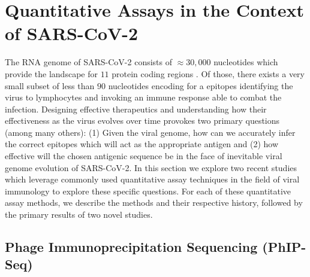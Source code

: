 \documentclass{article}
\begin{document}
\section*{Quantitative Assays in the Context of SARS-CoV-2}

The RNA genome of SARS-CoV-2 consists of $\approx 30,000$ nucleotides which provide the landscape for $11$ protein coding regions \citep{Naqvi2020}.
Of those, there exists a very small subset of less than $90$ nucleotides encoding for a epitopes identifying the virus to lymphocytes and invoking an immune response able to combat the infection.
Designing effective therapeutics and understanding how their effectiveness as the virus evolves over time provokes two primary questions (among many others):
(1) Given the viral genome, how can we accurately infer the correct epitopes which will act as the appropriate antigen and 
(2) how effective will the chosen antigenic sequence be in the face of inevitable viral genome evolution of SARS-CoV-2.
In this section we explore two recent studies which leverage commonly used quantitative assay techniques in the field of viral immunology to explore these specific questions. 
For each of these quantitative assay methods, we describe the methods and their respective history, followed by the primary results of two novel studies.


\subsection*{Phage Immunoprecipitation Sequencing (PhIP-Seq)}
\end{document}
